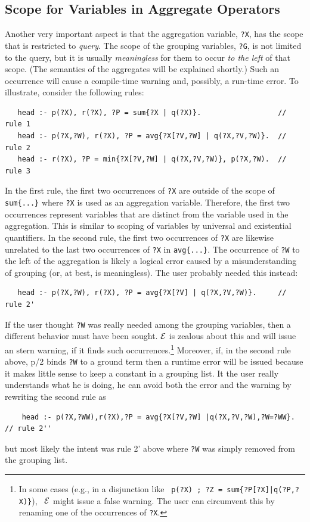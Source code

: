 \documentclass[11pt]{article}
\newcommand{\ERGO}{\mbox{\ensuremath{\cal{E}}\smaller{{\sc{RGO}}}}\xspace}
\newcommand{\FLSYSTEM}{\ERGO}
\begin{document}
\subsection{Scope for Variables in Aggregate Operators}

Another very important aspect is that 
the aggregation variable, \texttt{?X}, 
has the scope that is restricted to \emph{query}.
The scope of the grouping variables, \texttt{?G}, is not limited to the query,
but it is usually \emph{meaningless} for them to occur \emph{to
  the left} of that scope. (The semantics of the aggregates will be
explained shortly.)
Such an occurrence will cause a compile-time warning and, possibly, a
run-time error.
To illustrate, consider the following rules:
\begin{verbatim}
   head :- p(?X), r(?X), ?P = sum{?X | q(?X)}.                  // rule 1
   head :- p(?X,?W), r(?X), ?P = avg{?X[?V,?W] | q(?X,?V,?W)}.  // rule 2
   head :- r(?X), ?P = min{?X[?V,?W] | q(?X,?V,?W)}, p(?X,?W).  // rule 3
\end{verbatim}
In the first rule,
the first two occurrences of \texttt{?X}
are outside of the
scope of \texttt{sum\{...\}}  where \texttt{?X} is used as an aggregation
variable. Therefore, the first two occurrences represent
variables that are distinct from
the variable used in the aggregation. This is similar to
scoping of variables by universal and existential quantifiers. 
In the second rule, the first two occurrences of \texttt{?X} are likewise
unrelated to the last two
occurrences of \texttt{?X} in \texttt{avg\{...\}}.
The occurrence of \texttt{?W} to the left of the aggregation is likely a logical
error caused by a misunderstanding of grouping
(or, at best, is meaningless). The user probably needed
this instead:
\begin{verbatim}
   head :- p(?X,?W), r(?X), ?P = avg{?X[?V] | q(?X,?V,?W)}.     // rule 2'
\end{verbatim}
If the user thought \texttt{?W} was really needed among the grouping variables,
then a different behavior must have been sought.
\FLSYSTEM is zealous about this and will issue an stern warning, if it
finds such occurrences.\footnote{
  In some cases (e.g., in a disjunction like~
  \texttt{p(?X) ; ?Z = sum\{?P[?X]|q(?P,?X)\}}),~
  \FLSYSTEM might issue a false warning. The user can
  circumvent this by renaming one of the occurrences of \texttt{?X}. 
}
Moreover, if, in the second rule above, p/2 binds \texttt{?W} to a ground term
then a runtime error will be issued because it makes little sense to
keep a constant in a grouping list. It the user really understands what he
is doing, he can avoid both the error and the warning by rewriting the
second rule as
\begin{verbatim}
    head :- p(?X,?WW),r(?X),?P = avg{?X[?V,?W] |q(?X,?V,?W),?W=?WW}. // rule 2''
\end{verbatim}
but most likely the intent was rule 2' above where \texttt{?W} was simply
removed from the grouping list. 
\end{document}
